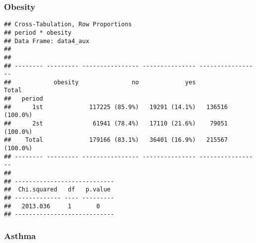 \documentclass[
]{article}
\newenvironment{Shaded}{\begin{snugshade}}{\end{snugshade}}
\newcommand{\DataTypeTok}[1]{\textcolor[rgb]{0.13,0.29,0.53}{#1}}
\newcommand{\KeywordTok}[1]{\textcolor[rgb]{0.13,0.29,0.53}{\textbf{#1}}}
\newcommand{\NormalTok}[1]{#1}
\newcommand{\OperatorTok}[1]{\textcolor[rgb]{0.81,0.36,0.00}{\textbf{#1}}}
\newcommand{\OtherTok}[1]{\textcolor[rgb]{0.56,0.35,0.01}{#1}}
\newcommand{\StringTok}[1]{\textcolor[rgb]{0.31,0.60,0.02}{#1}}
\begin{document}
\hypertarget{obesity-1}{%
\subsubsection{Obesity}\label{obesity-1}}

\begin{Shaded}
\end{Shaded}

\begin{verbatim}
## Cross-Tabulation, Row Proportions  
## period * obesity  
## Data Frame: data4_aux  
## 
## 
## -------- --------- ---------------- --------------- -----------------
##            obesity               no             yes             Total
##   period                                                             
##      1st             117225 (85.9%)   19291 (14.1%)   136516 (100.0%)
##      2st              61941 (78.4%)   17110 (21.6%)    79051 (100.0%)
##    Total             179166 (83.1%)   36401 (16.9%)   215567 (100.0%)
## -------- --------- ---------------- --------------- -----------------
## 
## ----------------------------
##  Chi.squared   df   p.value 
## ------------- ---- ---------
##   2013.036     1       0    
## ----------------------------
\end{verbatim}

\hypertarget{asthma-1}{%
\subsubsection{Asthma}\label{asthma-1}}

\begin{Shaded}
\end{Shaded}
\end{document}
